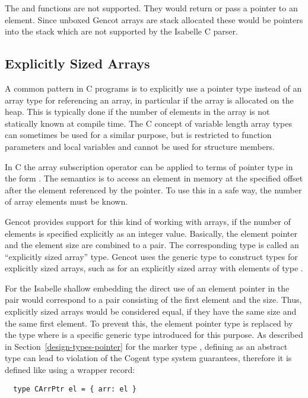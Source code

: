The  and  functions are not supported. They would return or pass a pointer to an element.
Since unboxed Gencot arrays are stack allocated these would be pointers into the stack which are not supported by the 
Isabelle C parser.

\subsection{Explicitly Sized Arrays}
\label{design-operations-esarray}

A common pattern in C programs is to explicitly use a pointer type instead of an array type for referencing an array,
in particular if the array is allocated on the heap. This is typically done if the number of elements in the
array is not statically known at compile time. The C concept of variable length array types can sometimes be
used for a similar purpose, but is restricted to function parameters and local variables and cannot be used for
structure members.

In C the array subscription operator can be applied to terms of pointer type  in the form . 
The semantics is to access an element in memory at the specified offset after the element referenced by the pointer. 
To use this in a safe way, the number of array elements must be known. 

Gencot provides support for this kind of working with arrays, if the number of elements is specified explicitly as
an integer value. Basically, the element pointer and the element size are combined to a pair. The corresponding type is called
an ``explicitly sized array'' type. Gencot uses the generic type 
to construct types for explicitly sized arrays, such as  for an explicitly sized array with elements
of type . 

For the Isabelle shallow embedding the direct use of an element pointer in the pair would correspond to a pair 
consisting of the first element and the size. Thus, explicitly sized arrays would be considered equal, if they have the
same size and the same first element. To prevent this, the element pointer type is replaced by the type 
where  is a specific generic type introduced for this purpose. As described
in Section~\ref{design-types-pointer} for the marker type , defining  as an abstract type can 
lead to violation of the Cogent type system guarantees, therefore it is defined like  using a wrapper 
record:
\begin{verbatim}
  type CArrPtr el = { arr: el }
\end{verbatim}

